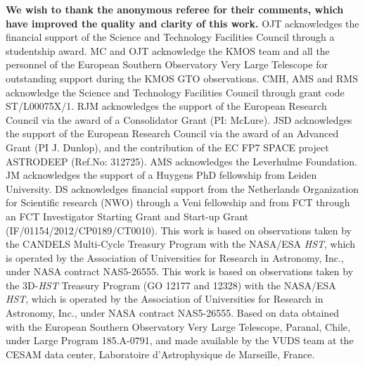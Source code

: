 \documentclass[fleqn,usenatbib]{mnras}
\begin{document}
\textbf{We wish to thank the anonymous referee for their comments, which have improved the quality and clarity of this work.}
OJT acknowledges the financial support of the Science and Technology Facilities Council through a studentship award. 
MC and OJT acknowledge the KMOS team and all the personnel of the European Southern Observatory Very Large Telescope for outstanding support during the KMOS GTO observations.
CMH, AMS and RMS acknowledge the Science and Technology Facilities Council through grant code ST/L00075X/1.
RJM acknowledges the support of the European Research Council via the award of a Consolidator Grant (PI: McLure).
JSD acknowledges the support of the European Research Council via the award of an Advanced Grant (PI J. Dunlop), and the contribution of the EC FP7 SPACE project ASTRODEEP (Ref.No: 312725).
AMS acknowledges the Leverhulme Foundation.
JM acknowledges the support of a Huygens PhD fellowship from Leiden University. DS acknowledges financial support from the Netherlands Organization for Scientific research (NWO) through a Veni fellowship and from FCT through an FCT Investigator Starting Grant and Start-up Grant (IF/01154/2012/CP0189/CT0010).
This work is based on observations taken by the CANDELS Multi-Cycle Treasury Program with the NASA/ESA {\em HST}, which is operated by the Association of Universities for Research in Astronomy, Inc., under NASA contract NAS5-26555.
This work is based on observations taken by the 3D-{\em HST} Treasury Program (GO 12177 and 12328) with the NASA/ESA {\em HST}, which is operated by the Association of Universities for Research in Astronomy, Inc., under NASA contract NAS5-26555.
Based on data obtained with the European Southern Observatory Very Large Telescope, Paranal, Chile, under Large Program 185.A-0791, and made available by the VUDS team at the CESAM data center, Laboratoire d'Astrophysique de Marseille, France.





%


\clearpage 

%

\clearpage
\end{document}
